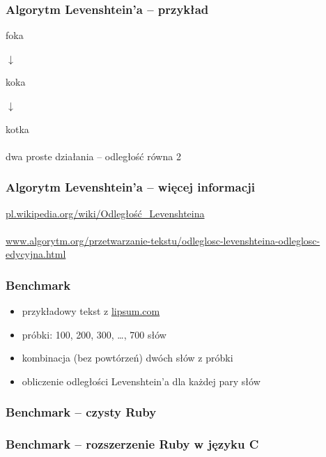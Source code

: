 \documentclass{beamer}
\begin{document}
  \begin{frame}
    \frametitle{Algorytm Levenshtein'a -- przykład}
    \begin{center}
       {\LARGE foka}


       {$\downarrow$}


       {\LARGE {\color{red}k}oka}


       {$\downarrow$}


       {\LARGE ko{\color{red}t}ka \\~\\}
       {\normalsize dwa proste działania -- odległość równa 2}
    \end{center}
  \end{frame}

  \begin{frame}
    \frametitle{Algorytm Levenshtein'a -- więcej informacji}
    \begin{center}
      \href{http://pl.wikipedia.org/wiki/Odleg\%C5\%82o\%C5\%9B\%C4\%87\_Levenshteina}{pl.wikipedia.org/wiki/Odległość\_Levenshteina} \\~\\
      \href{http://www.algorytm.org/przetwarzanie-tekstu/odleglosc-levenshteina-odleglosc-edycyjna.html}{www.algorytm.org/przetwarzanie-tekstu/odleglosc-levenshteina-odleglosc-edycyjna.html}
    \end{center}
  \end{frame}

  \begin{frame}
    \frametitle{Benchmark}
    \begin{center}
      \begin{itemize}
        \item przykładowy tekst z \href{http://lipsum.com/}{lipsum.com}
        \item próbki: 100, 200, 300, \ldots, 700 słów
        \item kombinacja (bez powtórzeń) dwóch słów z próbki
        \item obliczenie odległości Levenshtein'a dla każdej pary słów
      \end{itemize}
    \end{center}
  \end{frame}

  \begin{frame}
    \frametitle{Benchmark -- czysty Ruby}
    \begin{center}
      
    \end{center}
  \end{frame}

  \begin{frame}
    \frametitle{Benchmark -- rozszerzenie Ruby w języku C}
    \begin{center}
      
    \end{center}
  \end{frame}
\end{document}
